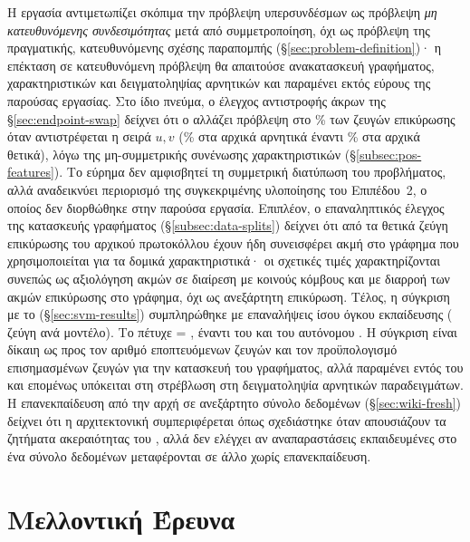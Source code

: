 Η εργασία αντιμετωπίζει σκόπιμα την πρόβλεψη υπερσυνδέσμων ως πρόβλεψη
\textit{μη κατευθυνόμενης συνδεσιμότητας} μετά από συμμετροποίηση, όχι ως
πρόβλεψη της πραγματικής, κατευθυνόμενης σχέσης παραπομπής
(\S\ref{sec:problem-definition})· η επέκταση σε κατευθυνόμενη πρόβλεψη θα
απαιτούσε ανακατασκευή γραφήματος, χαρακτηριστικών και δειγματοληψίας
αρνητικών και παραμένει εκτός εύρους της παρούσας εργασίας.
Στο ίδιο πνεύμα, ο
έλεγχος αντιστροφής άκρων της \S\ref{sec:endpoint-swap} δείχνει ότι ο
\texttt{} αλλάζει πρόβλεψη στο \SwapLabelChangePct\% των
ζευγών επικύρωσης όταν αντιστρέφεται η σειρά $u, v$ (\SwapNegClassChangePct\%
στα αρχικά αρνητικά έναντι \SwapPosClassChangePct\% στα αρχικά θετικά), λόγω
της μη-συμμετρικής συνένωσης χαρακτηριστικών 
(\S\ref{subsec:pos-features}).
Το εύρημα δεν αμφισβητεί τη συμμετρική
διατύπωση του προβλήματος, αλλά αναδεικνύει περιορισμό της συγκεκριμένης
υλοποίησης του Επιπέδου~2, ο οποίος δεν διορθώθηκε στην παρούσα εργασία.
Επιπλέον, ο επαναληπτικός έλεγχος της κατασκευής γραφήματος
(\S\ref{subsec:data-splits}) δείχνει ότι \AuditValPositivesInGraph{} από τα
\AuditValN{} θετικά ζεύγη επικύρωσης του αρχικού πρωτοκόλλου  έχουν
ήδη συνεισφέρει ακμή στο γράφημα που χρησιμοποιείται για τα δομικά
χαρακτηριστικά· οι σχετικές τιμές  χαρακτηρίζονται συνεπώς ως
αξιολόγηση ακμών σε  διαίρεση με κοινούς κόμβους και με
διαρροή των ακμών επικύρωσης στο γράφημα, όχι ως ανεξάρτητη επικύρωση.
Τέλος, η σύγκριση με το  (\S\ref{sec:svm-results})
συμπληρώθηκε με \MatchedNSeeds{} επαναλήψεις ίσου όγκου εκπαίδευσης
(\MatchedSampleSize{} ζεύγη ανά μοντέλο). Το  πέτυχε
 = \MatchedTfidfSvmFone{}, έναντι \MatchedCascadeFone{} του
 και \MatchedPosFone{} του αυτόνομου . Η σύγκριση είναι
δίκαιη ως προς τον αριθμό εποπτευόμενων ζευγών και τον προϋπολογισμό
επισημασμένων ζευγών για την κατασκευή του γραφήματος,
αλλά παραμένει εντός του  και επομένως υπόκειται στη στρέβλωση
στη δειγματοληψία αρνητικών παραδειγμάτων.
Η επανεκπαίδευση από την
αρχή σε ανεξάρτητο σύνολο δεδομένων  (\S\ref{sec:wiki-fresh})
δείχνει ότι η αρχιτεκτονική συμπεριφέρεται όπως σχεδιάστηκε όταν απουσιάζουν τα
ζητήματα ακεραιότητας του , αλλά δεν ελέγχει αν αναπαραστάσεις
εκπαιδευμένες στο ένα σύνολο δεδομένων μεταφέρονται σε άλλο χωρίς
επανεκπαίδευση.

\section{Μελλοντική Έρευνα}
\label{sec:future-work}

